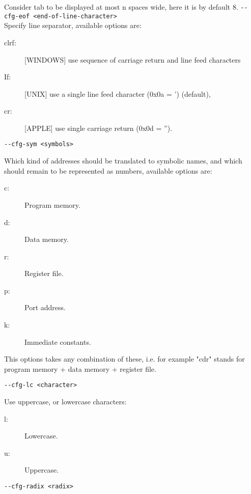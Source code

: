                 Consider tab to be displayed at most n spaces wide, here it is by default 8.
            {
                \usecodefont
                \verb'--cfg-eof <end-of-line-character>'\\
            }
                Specify line separator, available options are:
                \begin{description}
                  \item [clrf:] [WINDOWS] use sequence of carriage return and line feed characters
                  \item [If:] [UNIX] use a single line feed character (0x0a = ') (default),
                  \item [cr:] [APPLE] use single carriage return (0x0d = '').
                \end{description}
                {
                \usecodefont

                \verb'--cfg-sym <symbols>'\\
                }
                Which kind of addresses should be translated to symbolic names, and which should remain to be represented as numbers, available options are:
                \begin{description}
                    \item [c:] Program memory.
                    \item [d:] Data memory.
                    \item [r:] Register file.
                    \item [p:] Port address.
                    \item [k:] Immediate constants.
                \end{description}
                 This options takes any combination of these, i.e. for example "cdr" stands for program memory + data memory + register file.
                {
                \usecodefont

                \verb'--cfg-lc <character>'\\
                }
                Use uppercase, or lowercase characters:
                \begin{description}
                    \item [l:] Lowercase.
                    \item [u:] Uppercase.
                \end{description}
                {
                \usecodefont

                \verb'--cfg-radix <radix>'\\
                }
